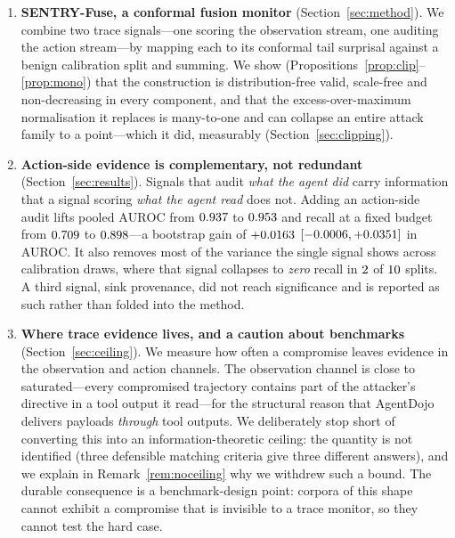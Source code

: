 \documentclass[preprint,12pt,number]{elsarticle}
\theoremstyle{definition}
\begin{document}
\begin{enumerate}
\item \textbf{SENTRY-Fuse, a conformal fusion monitor}
(Section~\ref{sec:method}). We combine two trace signals---one scoring the
observation stream, one auditing the action stream---by mapping each to its
conformal tail surprisal against a benign calibration split and summing. We show
(Propositions~\ref{prop:clip}--\ref{prop:mono}) that the construction is
distribution-free valid, scale-free and non-decreasing in every component, and
that the excess-over-maximum normalisation it replaces is many-to-one and can
collapse an entire attack family to a point---which it did, measurably
(Section~\ref{sec:clipping}).

\item \textbf{Action-side evidence is complementary, not redundant}
(Section~\ref{sec:results}). Signals that audit \emph{what the agent did} carry
information that a signal scoring \emph{what the agent read} does not. Adding
an action-side audit lifts pooled $\mathrm{AUROC}$ from $0.937$ to
$0.953$ and recall at a fixed budget from $0.709$ to
$0.898$---a bootstrap gain of $+0.0163$
$[-0.0006, +0.0351]$ in AUROC. It also removes most of the
variance the single signal shows across calibration draws, where that signal
collapses to \emph{zero} recall in $2$ of $10$ splits. A third
signal, sink provenance, did not reach significance and is reported as such rather
than folded into the method.

\item \textbf{Where trace evidence lives, and a caution about benchmarks}
(Section~\ref{sec:ceiling}). We measure how often a compromise leaves evidence in
the observation and action channels. The observation channel is close to
saturated---every compromised trajectory contains part of the attacker's directive
in a tool output it read---for the structural reason that AgentDojo delivers
payloads \emph{through} tool outputs. We deliberately stop short of converting
this into an information-theoretic ceiling: the quantity is not identified (three
defensible matching criteria give three different answers), and we explain in
Remark~\ref{rem:noceiling} why we withdrew such a bound.
The durable consequence is a benchmark-design point: corpora of this
shape cannot exhibit a compromise that is invisible to a trace monitor, so they
cannot test the hard case.


\end{enumerate}
\end{document}
